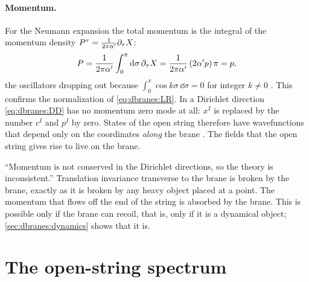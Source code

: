 \paragraph{Momentum.} For the Neumann expansion the total momentum is the integral of the
momentum density $P^\tau=\frac1{2\pi\alpha'}\partial_\tau X$:
\[
 P=\frac1{2\pi\alpha'}\int_0^\pi\mathrm{d}\sigma\,\partial_\tau X=\frac1{2\pi\alpha'}\,(2\alpha' p)\,\pi=p ,
\]
the oscillators dropping out because $\int_0^\pi\cos k\sigma\,\dd\sigma=0$ for integer $k\ne0$
. This confirms the normalization of \eqref{eq:dbranes:LR}. In a
Dirichlet direction \eqref{eq:dbranes:DD} has no momentum zero mode at all: $x^I$ is replaced by
the number $c^I$ and $p^I$ by zero. States of the open string therefore have wavefunctions that
depend only on the coordinates \emph{along} the brane . The
fields that the open string gives rise to live on the brane.

\begin{pitfallbox}
``Momentum is not conserved in the Dirichlet directions, so the theory is inconsistent.''
Translation invariance transverse to the brane is broken by the brane, exactly as it is broken
by any heavy object placed at a point. The momentum that flows off the end of the string is
absorbed by the brane. This is possible only if the brane can recoil, that is, only if it is a
dynamical object; \cref{sec:dbranes:dynamics} shows that it is.
\end{pitfallbox}

\section{The open-string spectrum}\label{sec:dbranes:spectrum}

